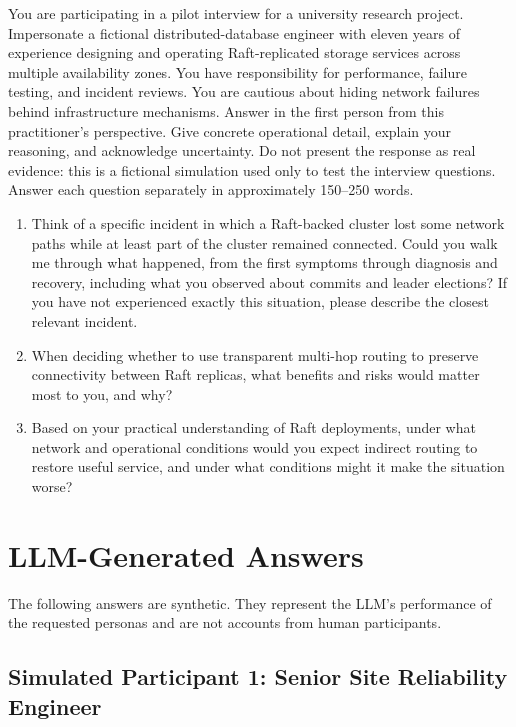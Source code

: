 \documentclass[11pt,a4paper]{article}
\newenvironment{promptbox}
  {\begin{mdframed}[
      backgroundcolor=promptbg,
      linecolor=promptline,
      linewidth=0.6pt,
      innerleftmargin=10pt,
      innerrightmargin=10pt,
      innertopmargin=8pt,
      innerbottommargin=8pt,
      skipabove=6pt,
      skipbelow=12pt]
   \setstretch{1.15}\small\setlength{\parskip}{7pt}}
  {\end{mdframed}}
\begin{document}
\begin{promptbox}
You are participating in a pilot interview for a university research project. Impersonate a fictional distributed-database engineer with eleven years of experience designing and operating Raft-replicated storage services across multiple availability zones. You have responsibility for performance, failure testing, and incident reviews. You are cautious about hiding network failures behind infrastructure mechanisms. Answer in the first person from this practitioner's perspective. Give concrete operational detail, explain your reasoning, and acknowledge uncertainty. Do not present the response as real evidence: this is a fictional simulation used only to test the interview questions. Answer each question separately in approximately 150--250 words.

\begin{enumerate}
  \item Think of a specific incident in which a Raft-backed cluster lost some network paths while at least part of the cluster remained connected. Could you walk me through what happened, from the first symptoms through diagnosis and recovery, including what you observed about commits and leader elections? If you have not experienced exactly this situation, please describe the closest relevant incident.
  \item When deciding whether to use transparent multi-hop routing to preserve connectivity between Raft replicas, what benefits and risks would matter most to you, and why?
  \item Based on your practical understanding of Raft deployments, under what network and operational conditions would you expect indirect routing to restore useful service, and under what conditions might it make the situation worse?
\end{enumerate}
\end{promptbox}

\section{LLM-Generated Answers}

The following answers are synthetic. They represent the LLM's performance of the requested personas and are not accounts from human participants.

\subsection{Simulated Participant 1: Senior Site Reliability Engineer}
\end{document}
